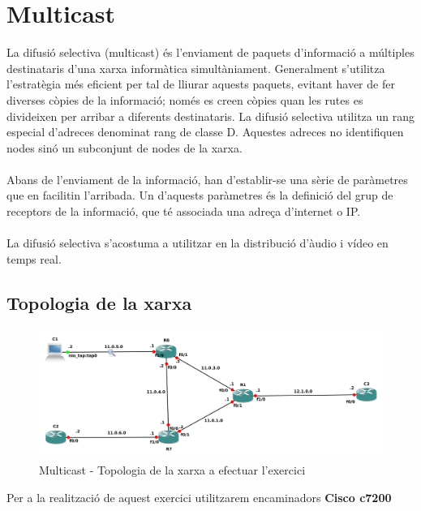 \documentclass[10pt]{article}
\begin{document}
\section{Multicast}
La difusió selectiva (multicast) és l'enviament de paquets d'informació a múltiples destinataris d'una xarxa informàtica simultàniament. Generalment s'utilitza l'estratègia més eficient per tal de lliurar aquests paquets, evitant haver de fer diverses còpies de la informació; només es creen còpies quan les rutes es divideixen per arribar a diferents destinataris. La difusió selectiva utilitza un rang especial d'adreces denominat rang de classe D. Aquestes adreces no identifiquen nodes sinó un subconjunt de nodes de la xarxa.
\\\\
Abans de l'enviament de la informació, han d'establir-se una sèrie de paràmetres que en facilitin l'arribada. Un d'aquests paràmetres és la definició del grup de receptors de la informació, que té associada una adreça d'internet o IP.
\\\\
La difusió selectiva s'acostuma a utilitzar en la distribució d'àudio i vídeo en temps real.
\subsection{Topologia de la xarxa}
\begin{figure}[H]
\begin{center}
\includegraphics[scale=0.4]{Images/topology1.png}
\caption{Multicast - Topologia de la xarxa a efectuar l'exercici}
\end{center}
\end{figure}
Per a la realització de aquest exercici utilitzarem encaminadors \textbf{Cisco c7200}
\end{document}
